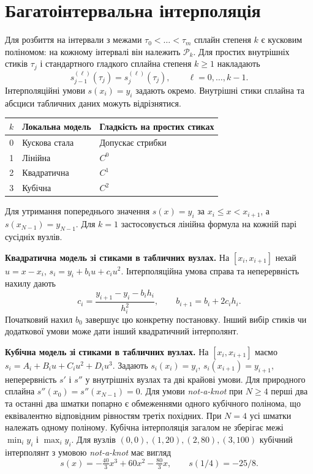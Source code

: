 \documentclass[11pt,a4paper]{article}
\newcommand{\PP}{\mathcal P}
\begin{document}
\section{Багатоінтервальна інтерполяція}
Для розбиття на інтервали з межами $\tau_0<\dots<\tau_m$ сплайн степеня $k$ є кусковим поліномом: на кожному інтервалі він належить $\PP_k$.
Для простих внутрішніх стиків $\tau_j$ і стандартного гладкого сплайна степеня $k\ge1$ накладають
\[
s_{j-1}^{(\ell)}(\tau_j)=s_{j}^{(\ell)}(\tau_j),
\qquad \ell=0,\ldots,k-1.
\]
Інтерполяційні умови $s(x_i)=y_i$ задають окремо.
Внутрішні стики сплайна та абсциси табличних даних можуть відрізнятися.

\begin{center}
\begin{tabular}{cll}
\toprule
$k$ & Локальна модель & Гладкість на простих стиках\\
\midrule
0 & Кускова стала & Допускає стрибки\\
1 & Лінійна & $C^0$\\
2 & Квадратична & $C^1$\\
3 & Кубічна & $C^2$\\
\bottomrule
\end{tabular}
\end{center}
Для утримання попереднього значення $s(x)=y_i$ за $x_i\le x<x_{i+1}$,
а $s(x_{N-1})=y_{N-1}$.
Для $k=1$ застосовується лінійна формула на кожній парі сусідніх вузлів.

\textbf{Квадратична модель зі стиками в табличних вузлах.}
На $[x_i,x_{i+1}]$ нехай $u=x-x_i$, $s_i=y_i+b_i u+c_i u^2$.
Інтерполяційна умова справа та неперервність нахилу дають
\[
c_i=\frac{y_{i+1}-y_i-b_i h_i}{h_i^2},\qquad b_{i+1}=b_i+2c_i h_i .
\]
Початковий нахил $b_0$ завершує цю конкретну постановку.
Інший вибір стиків чи додаткової умови може дати інший квадратичний інтерполянт.

\textbf{Кубічна модель зі стиками в табличних вузлах.}
На $[x_i,x_{i+1}]$ маємо $s_i=A_i+B_i u+C_i u^2+D_i u^3$.
Задають $s_i(x_i)=y_i$, $s_i(x_{i+1})=y_{i+1}$, неперервність $s'$ і $s''$ у внутрішніх вузлах та дві крайові умови.
Для природного сплайна $s''(x_0)=s''(x_{N-1})=0$.
Для умови \textit{not-a-knot} при $N\ge4$ перші два та останні два шматки попарно є обмеженнями одного кубічного полінома, що еквівалентно відповідним рівностям третіх похідних. При $N=4$ усі шматки належать одному поліному.
Кубічна інтерполяція загалом не зберігає межі $\min_i y_i$ і $\max_i y_i$.
Для вузлів $(0,0),(1,20),(2,80),(3,100)$ кубічний інтерполянт з умовою \textit{not-a-knot} має вигляд
\[
s(x)=-\tfrac{40}{3}x^3+60x^2-\tfrac{80}{3}x,\qquad s(1/4)=-25/8 .
\]
\end{document}
